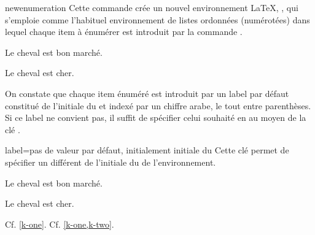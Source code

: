 \documentclass[french,nolocaltoc]{nwejmart}
\newtheorem[style=definition]{fait}
\newtheorem[title=expérience]{experience}
\newtheorem[title-plural=anneaux]{anneau}
\newtheorem[title=idéal,title-plural=idéaux]{ideal}
\begin{document}
\begin{docCommand}[doc new=2019-03-18]{newenumeration}{}
  Cette commande crée un nouvel environnement \LaTeX{}, , qui
  s'emploie comme l'habituel environnement  de
  listes ordonnées (numérotées) dans lequel chaque item à énumérer
  est introduit par la commande .

\begin{preamblecode}
\end{preamblecode}
\begin{bodycode}
\begin{conventions}
\item Le cheval est bon marché.
\item Le cheval est cher.
\end{conventions}
\end{bodycode}

  On constate que chaque item énuméré est introduit par un label par défaut
  constitué de l'initiale du  et indexé par un chiffre arabe, le tout
  entre parenthèses. Si ce label ne convient pas, il suffit de spécifier celui
  souhaité en  au moyen de la clé .
  \begin{docKey}{label}{={}}{pas de
      valeur par défaut, initialement initiale du }
    Cette clé permet de spécifier un  différent de l'initiale du
     de l'environnement.
  \end{docKey}
\begin{preamblecode}
\end{preamblecode}
\begin{bodycode}[listing and text,listing options={deletekeywords={[2]label}}]
\begin{conventions}
\item\label{k-one} Le cheval est bon marché.
\item\label{k-two} Le cheval est cher.
\end{conventions}
Cf. \vref{k-one}. Cf. \vref{k-one,k-two}.
\end{bodycode}


\end{docCommand}
\end{document}
